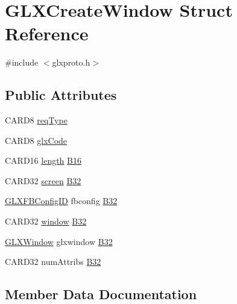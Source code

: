 \hypertarget{struct_g_l_x_create_window}{}\section{G\+L\+X\+Create\+Window Struct Reference}
\label{struct_g_l_x_create_window}


{\ttfamily \#include $<$glxproto.\+h$>$}

\subsection*{Public Attributes}
\begin{DoxyCompactItemize}
\item 
C\+A\+R\+D8 \hyperlink{struct_g_l_x_create_window_ab256caccb1396b5a57fcf1068e919616}{req\+Type}
\item 
C\+A\+R\+D8 \hyperlink{struct_g_l_x_create_window_ae8d545b3aca429f588bb6b6a9c10b20d}{glx\+Code}
\item 
C\+A\+R\+D16 \hyperlink{glcorearb_8h_ab9c919755bde3b34349e23a32b4e0fa7}{length} \hyperlink{struct_g_l_x_create_window_ae79fc7e160225bc55a206a038234e721}{B16}
\item 
C\+A\+R\+D32 \hyperlink{cad_8h_ae04e09e4e3831bfc1632c509ae37dcec}{screen} \hyperlink{struct_g_l_x_create_window_a420e36cf1a57bf686722e89710ff62d7}{B32}
\item 
\hyperlink{glx_8h_a38e78acefebf732d1a0da441ad1de05f}{G\+L\+X\+F\+B\+Config\+ID} fbconfig \hyperlink{struct_g_l_x_create_window_a10f6b4dcfae8efedc4eb2f08b5f522c9}{B32}
\item 
C\+A\+R\+D32 \hyperlink{classwindow}{window} \hyperlink{struct_g_l_x_create_window_ad0f84f86ca4dd494d9412c95bd52a697}{B32}
\item 
\hyperlink{glx_8h_a7b7fbb726212feadef35c6c7c09b9541}{G\+L\+X\+Window} glxwindow \hyperlink{struct_g_l_x_create_window_a5f89f710cafe0260a355df397020ee85}{B32}
\item 
C\+A\+R\+D32 num\+Attribs \hyperlink{struct_g_l_x_create_window_a285b05a764dd23c30fe6407c52e43546}{B32}
\end{DoxyCompactItemize}


\subsection{Member Data Documentation}
\mbox{\label{struct_g_l_x_create_window_ae79fc7e160225bc55a206a038234e721}} 
